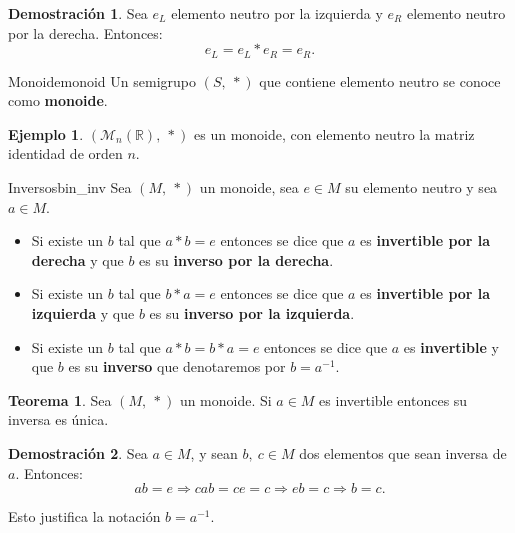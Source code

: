 \documentclass[a4paper]{book}
\theoremstyle{definition}
\newtheorem{theorem}{Teorema}[section]
\theoremstyle{ejemplo}
\newtheorem{ejem}{Ejemplo}[section]
\theoremstyle{demostracion}
\newtheorem{dem}{Demostración}
\newcommand{\reales}{\mathbb{R}}
\begin{document}
\begin{dem}
	Sea $e_L$ elemento neutro por la izquierda y $e_R$ elemento neutro por la derecha. Entonces:
	\begin{equation*}
		e_L = e_L * e_R = e_R.
	\end{equation*}
\end{dem}

\begin{define}{Monoide}{monoid}
	Un semigrupo $(S,\ *)$ que contiene elemento neutro se conoce como \textbf{monoide}.
\end{define}

\begin{ejem}
	$(\mathcal{M}_{n}(\reales),\ *)$ es un monoide, con elemento neutro la matriz identidad de orden $n$.
\end{ejem}

\begin{define}{Inversos}{bin_inv}
	Sea $(M,\ *)$ un monoide, sea $e \in M$ su elemento neutro y sea $a \in M$.
	\begin{itemize}
		\item
		Si existe un $b$ tal que $a*b = e$ entonces se dice que $a$ es \textbf{invertible por la derecha} y que $b$ es su \textbf{inverso por la derecha}.
		
		\item
		Si existe un $b$ tal que $b*a = e$ entonces se dice que $a$ es \textbf{invertible por la izquierda} y que $b$ es su \textbf{inverso por la izquierda}.
		
		\item
		Si existe un $b$ tal que $a*b = b*a = e$ entonces se dice que $a$ es \textbf{invertible} y que $b$ es su \textbf{inverso} que denotaremos por $b = a^{-1}$.
	\end{itemize}
\end{define}

\begin{theorem}
	Sea $(M,\ *)$ un monoide. Si $a \in M$ es invertible entonces su inversa es única.
\end{theorem}

\begin{dem}
	Sea $a \in M$, y sean $b,\ c \in M$ dos elementos que sean inversa de $a$. Entonces:
	\begin{equation*}
		ab = e \Rightarrow cab = ce = c \Rightarrow eb = c \Rightarrow b = c.
	\end{equation*}
\end{dem}

Esto justifica la notación $b = a^{-1}$.
\end{document}
